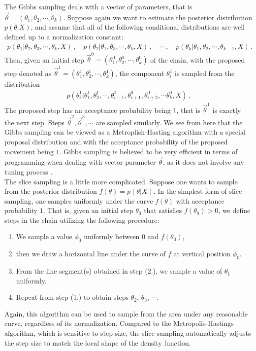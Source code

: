 \documentclass[11pt]{article}
\theoremstyle{break}
\theoremstyle{break}
\begin{document}
${}$\qquad The Gibbs sampling deals with a vector of parameters, that is $\vec{\theta} = (\theta_1,\theta_2,\cdots, \theta_k)$. Suppose again we want to estimate the posterior distribution $p(\theta|X)$, and assume that all of the following conditional distributions are well defined up to a normalization constant:
\begin{align*}
p(\theta_1 | \theta_2,\theta_3,\cdots,\theta_k,X) \,,\quad
p(\theta_2 | \theta_1,\theta_3,\cdots,\theta_k,X) \,,\quad
\cdots\,,\quad
p(\theta_k | \theta_1,\theta_2,\cdots,\theta_{k-1},X)\,.
\end{align*}
Then, given an initial step $\vec{\theta}^0 = (\theta_1^0,\theta_2^0,\cdots, \theta_k^0)$ of the chain, with the proposed step denoted as $\vec{\theta}^1=(\theta_1^1,\theta_2^1,\cdots, \theta_k^1)$, the component $\theta_i^1$ is sampled from the distribution
\begin{align*}
p(\theta_i^1 |\theta_1^1, \theta_2^1, \cdots, \theta_{i-1}^1, \theta_{i+1}^0, \theta_{i+2}^0,\cdots \theta_k^0, X)\,. 
\end{align*}
The proposed step has an acceptance probability being $1$, that is $\vec{\theta}^1$ is exactly the next step. Steps $\vec{\theta}^2, \vec{\theta}^3, \cdots$ are sampled similarly. We see from here that the Gibbs sampling can be viewed as a Metroplish-Hasting algorithm with a special proposal distribution and with the acceptance probability of the proposed movement being $1$. Gibbs sampling is believed to be very efficient in terms of programming when dealing with vector parameter $\vec{\theta}$, as it does not involve any tuning process \cite{Duke}.\\

${}$\qquad The slice sampling is a little more complicated. Suppose one wants to sample from the posterior distribution $f(\theta) = p(\theta|X)$. In the simplest form of slice sampling, one samples uniformly under the curve $f(\theta)$ with acceptance probability $1$. That is, given an initial step $\theta_0$ that satisfies $f(\theta_0) > 0$, we define steps in the chain utilizing the following procedure:
\begin{enumerate}[topsep=3pt,itemsep=-1ex,partopsep=1ex,parsep=1ex]
\item We sample a value $\phi_0$ uniformly between $0$ and $f(\theta_0)$, 
\item then we draw a horizontal line under the curve of $f$ at vertical position $\phi_0$.
\item From the line segment(s) obtained in step (2.), we sample a value of $\theta_1$ uniformly. 
\item Repeat from step (1.) to obtain steps $\theta_2$, $\theta_3$, $\cdots$.  
\end{enumerate}
Again, this algorithm can be used to sample from the area under any reasonable curve, regardless of its normalization. Compared to the Metropolis-Hastings algorithm, which is sensitive to step size, the slice sampling automatically adjusts the step size to match the local shape of the density function.
\end{document}
